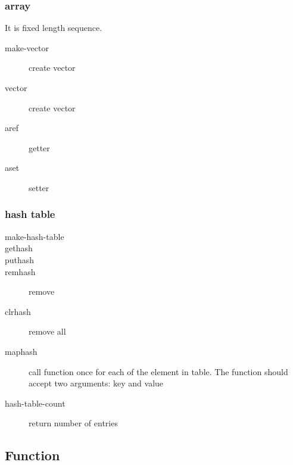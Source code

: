 \subsubsection{array}
It is fixed length sequence.
\begin{description}
\item [make-vector ] create vector
\item [vector ] create vector
\item [aref ] getter
\item [aset ] setter
\end{description}

\subsubsection{hash table}
\begin{description}
\item [make-hash-table]

\item [gethash ]
\item [puthash ]
\item [remhash ] remove
\item [clrhash ] remove all
\item [maphash ] call function once for each of the
  element in table. The function should accept two arguments: key and
  value
\item [hash-table-count ] return number of entries
\end{description}

\subsection{Function}

